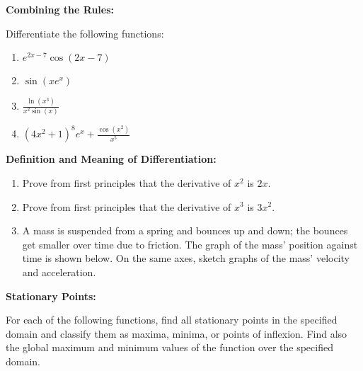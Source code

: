 \documentclass{article}
\begin{document}
\clearpage


\textbf{Combining the Rules:}

\vspace{5mm}

Differentiate the following functions:

\begin{enumerate}
	\item $e^{2x-7}\cos(2x-7)$
	\item $\sin(xe^x)$
	\item $\frac{\ln(x^3)}{x^2\sin(x)}$
	\item $(4x^2+1)^8e^x + \frac{\cos(x^2)}{x^5}$
\end{enumerate}



\clearpage

\textbf{Definition and Meaning of Differentiation:}

\vspace{5mm}

\begin{enumerate}
	\item Prove from first principles that the derivative of $x^2$ is $2x$.
	\item Prove from first principles that the derivative of $x^3$ is $3x^2$.
	\item A mass is suspended from a spring and bounces up and down; the bounces get smaller over time due to friction. The graph of the mass' position against time is shown below. On the same axes, sketch graphs of the mass' velocity and acceleration.
		\begin{center}
		\end{center}
\end{enumerate}




\clearpage


\textbf{Stationary Points:}

\vspace{5mm}

For each of the following functions, find all stationary points in the specified domain and classify them as maxima, minima, or points of inflexion. Find also the global maximum and minimum values of the function over the specified domain.
\end{document}
